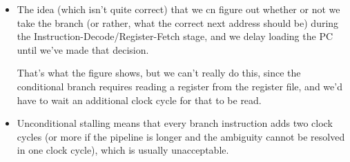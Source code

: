 \begin{frame}[fragile]
\begin{itemize}


  


\end{itemize}
\BNotes\ifnum{}
\begin{itemize}
\item The idea (which isn't quite correct) that we cn figure out whether or
  not we take the branch (or rather, what the correct next address should be)
  during the Instruction-Decode/Register-Fetch stage, and we delay loading
  the PC until we've made that decision.

  That's what the figure shows, but we can't really do this, since the
  conditional branch requires reading a register from the register file,
  and we'd have to wait an additional clock cycle for that to be read.
\item
Unconditional stalling means that every branch instruction adds two
clock cycles (or more if the pipeline is longer and the ambiguity
cannot be resolved in one clock cycle), which is usually unacceptable.
\end{itemize}
\fi\ENotes
\end{frame}

